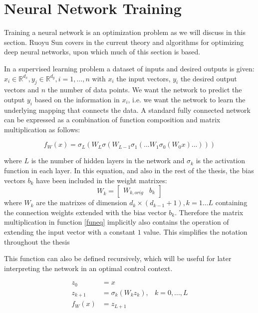 \newpage

\section{Neural Network Training}
Training a neural network is an optimization problem as we will discuss in this section. Ruoyu Sun covers in \cite{sun2019optimization} the current theory and algorithms for optimizing deep neural networks, upon which much of this section is based.

In a supervised learning problem a dataset of inputs and desired outputs is given: $x_i \in \mathbb{R}^{d_x}, y_j \in \mathbb{R}^{d_y}, i = 1,\dots,n$ with $x_i$ the input vectors, $y_i$ the desired output vectors and $n$ the number of data points. We want the network to predict the output $y_i$ based on the information in $x_i$, i.e. we want the network to learn the underlying mapping that connects the data. A standard fully connected network can be expressed as a combination of function composition and matrix multiplication as follows:

\begin{equation}
         f_W(x) = \sigma_L(W_L\sigma(W_{L-1}\sigma_1(...W_1\sigma_0(W_0x)...)))
         \label{funeq}
\end{equation}

where $L$ is the number of hidden layers in the network and $\sigma_k$ is the activation function in each layer. In this equation, and also in the rest of the thesis, the bias vectors $b_k$ have been included in the weight matrixes:
\begin{equation}
W_k = \begin{bmatrix} W_{k,orig} & b_k \end{bmatrix}
\end{equation}
where $W_k$ are the matrixes of dimension $d_k \times (d_{k-1}+1), k=1 \dots L$ containing the connection weights extended with the bias vector $b_k$. Therefore the matrix multiplication in function \ref{funeq} implicitly also contains the operation of extending the input vector with a constant $1$ value. This simplifies the notation throughout the thesis

This function can also be defined recursively, which will be useful for later interpreting the network in an optimal control context.

\begin{equation}
	\begin{aligned}
	z_0 &= x \\
	z_{k+1} &= \sigma_k(W_kz_k), & k = 0,...,L \\
	f_W(x) &= z_{L+1} \\
	\end{aligned}
\label{st-eq}
\end{equation}

